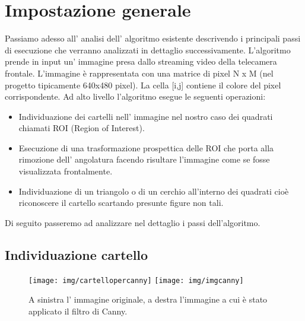 \section{Impostazione generale}

	Passiamo adesso all' analisi dell' algoritmo esistente descrivendo i principali passi di esecuzione che verranno analizzati in dettaglio successivamente. L'algoritmo prende in input un' immagine presa dallo streaming video della telecamera frontale. L'immagine è rappresentata con una matrice di pixel N x M (nel progetto tipicamente 640x480 pixel). La cella [i,j] contiene il colore del pixel corrispondente. Ad alto livello l'algoritmo esegue le seguenti operazioni:
	\begin{itemize}
		\item Individuazione dei cartelli nell' immagine nel nostro caso dei quadrati chiamati ROI (Region of Interest).
		\item Esecuzione di una trasformazione prospettica delle ROI che porta alla rimozione dell' angolatura facendo risultare l'immagine come se fosse visualizzata frontalmente.
		\item Individuazione di un triangolo o di un cerchio all'interno dei quadrati cioè riconoscere il cartello scartando presunte figure non tali.
	\end{itemize}
	Di seguito passeremo ad analizzare nel dettaglio i passi dell'algoritmo.

\subsection{Individuazione cartello}
	\begin{figure}[!ht]
		\centering
		\texttt{[image: img/cartellopercanny]}
		\texttt{[image: img/imgcanny]}
		\caption[Esempio filtro di Canny]{A sinistra l' immagine originale, a destra l'immagine a cui è stato applicato il filtro di Canny.}
	\end{figure}

